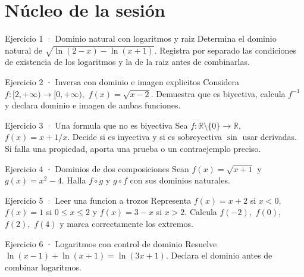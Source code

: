 \documentclass[10pt,a4paper,oneside,openany]{book}
\begin{document}
\section*{Núcleo de la sesión}
\begin{PSevenExerciseFixed}{Ejercicio 1 · Dominio natural con logaritmos y raiz}
Determina el dominio natural de \(\sqrt{\ln(2-x)-\ln(x+1)}\). Registra por separado las condiciones de existencia de los logaritmos y la de la raiz antes de combinarlas.
\end{PSevenExerciseFixed}
\begin{PSevenExerciseFixed}{Ejercicio 2 · Inversa con dominio e imagen explicitos}
Considera \(f:[2,+\infty )\to [0,+\infty ),\) \(f(x)=\sqrt{x-2}\). Demuestra que es biyectiva, calcula \(f^{-1}\) y declara dominio e imagen de ambas funciones.
\end{PSevenExerciseFixed}
\begin{PSevenExerciseFixed}{Ejercicio 3 · Una formula que no es biyectiva}
Sea \(f:\mathbb{R}\setminus \{0\}\to \mathbb{R},\) \(f(x)=x+1/x\). Decide si es inyectiva y si es sobreyectiva \(\sin\) usar derivadas. Si falla una propiedad, aporta una prueba o un contraejemplo preciso.
\end{PSevenExerciseFixed}
\begin{PSevenExerciseFixed}{Ejercicio 4 · Dominios de dos composiciones}
Sean \(f(x)=\sqrt{x+1}\) y \(g(x)=x^{2}-4\). Halla \(f\circ g\) y \(g\circ f\) con sus dominios naturales.
\end{PSevenExerciseFixed}
\begin{PSevenExerciseFixed}{Ejercicio 5 · Leer una funcion a trozos}
Representa \(f(x)=x+2\) si \(x<0,\) \(f(x)=1\) si \(0\le x\le 2\) y \(f(x)=3-x\) si \(x>2\). Calcula \(f(-2),\) \(f(0),\) \(f(2),\) \(f(4)\) y marca correctamente los extremos.
\end{PSevenExerciseFixed}
\begin{PSevenExerciseFixed}{Ejercicio 6 · Logaritmos con control de dominio}
Resuelve \(\ln(x-1)+\ln(x+1)=\ln(3x+1)\). Declara el dominio antes de combinar logaritmos.
\end{PSevenExerciseFixed}
\end{document}
